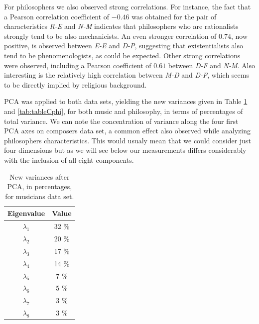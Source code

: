 \documentclass[
 aip,
 jmp,
 amsmath,amssymb,
 reprint,
]{revtex4-1}
\begin{document}
For philosophers we also observed strong correlations. For instance, the fact that a Pearson
correlation coefficient of $-0.46$ was obtained for the pair of
characteristics \emph{R-E} and \emph{N-M} indicates that philosophers
who are rationalists strongly tend to be also mechanicists.  An even
stronger correlation of $0.74$, now positive, is observed between
\emph{E-E} and \emph{D-P}, suggesting that existentialists also tend
to be phenomenologists, as could be expected.  Other strong
correlations were observed, including a Pearson coefficient of $0.61$
between \emph{D-F} and \emph{N-M}.  Also interesting is the relatively
high correlation between \emph{M-D} and \emph{D-F}, which seems to be
directly implied by religious background.

PCA was applied to both data sets, yielding the new variances given
in Table \ref{tab:tableCmus} and \ref{tab:tableCphi}, for both music and philosophy, in terms of percentages of total variance.
We can note the concentration of variance along the four
first PCA axes on composers data set, a common effect also observed while analyzing philosophers characteristics. This would usualy mean that we could
consider just four dimensions but as we will see below our measurements
differs considerably with the inclusion of all eight components.

\begin{table}[ht]
\caption{\label{tab:tableCmus}New variances after PCA, in percentages, for musicians data set.}
\begin{tabular}{|c||c|}
\hline
Eigenvalue  & Value     \\ \hline
$\lambda_1$ &  32 \% \\
$\lambda_2$ &  20 \% \\
$\lambda_3$ &  17 \% \\
$\lambda_4$ &  14 \% \\
$\lambda_5$ &   7 \% \\
$\lambda_6$ &   5 \% \\
$\lambda_7$ &   3 \% \\
$\lambda_8$ &   3 \% \\
\hline
\end{tabular}
\end{table}
\end{document}

